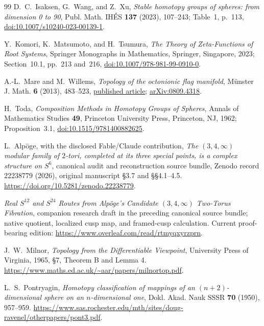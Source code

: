 \begin{thebibliography}{99}
D.~C.~Isaksen, G.~Wang, and Z.~Xu,
\emph{Stable homotopy groups of spheres: from dimension 0 to 90},
Publ. Math. IH\'ES \textbf{137} (2023), 107--243; Table~1, p.~113,
\href{https://doi.org/10.1007/s10240-023-00139-1}
{doi:10.1007/s10240-023-00139-1}.

Y.~Komori, K.~Matsumoto, and H.~Tsumura,
\emph{The Theory of Zeta-Functions of Root Systems},
Springer Monographs in Mathematics, Springer, Singapore, 2023;
Section~10.1, pp.~213 and~216,
\href{https://doi.org/10.1007/978-981-99-0910-0}
{doi:10.1007/978-981-99-0910-0}.

A.-L.~Mare and M.~Willems,
\emph{Topology of the octonionic flag manifold},
M\"unster J. Math. \textbf{6} (2013), 483--523,
\href{https://www.uni-muenster.de/FB10/mjm/vol_6/mjm_vol_6_14.pdf}
{published article};
\href{https://arxiv.org/abs/0809.4318}{arXiv:0809.4318}.

H.~Toda,
\emph{Composition Methods in Homotopy Groups of Spheres},
Annals of Mathematics Studies \textbf{49},
Princeton University Press, Princeton, NJ, 1962;
Proposition~3.1,
\href{https://doi.org/10.1515/9781400882625}
{doi:10.1515/9781400882625}.

L.~Alp\"oge, with the disclosed Fable/Claude contribution,
\emph{The \((3,4,\infty)\) modular family of \(2\)-tori, completed at
its three special points, is a complex structure on \(S^6\)},
canonical audit and reconstruction source bundle, Zenodo record 22238779
(2026), original manuscript \S3.7 and \S\S4.1--4.5.
\url{https://doi.org/10.5281/zenodo.22238779}.

\emph{Real \(S^{12}\) and \(S^{24}\) Routes from Alp\"oge's
Candidate \((3,4,\infty)\) Two-Torus Fibration},
companion research draft in the preceding canonical source bundle;
native quotient, localized cusp map, and framed-cusp calculation.
Current proof-bearing edition:
\url{https://www.overleaf.com/read/rtmyqxyrzprn}.

J.~W.~Milnor, \emph{Topology from the Differentiable Viewpoint},
University Press of Virginia, 1965, \S7, Theorem B and Lemma 4.
\url{https://www.maths.ed.ac.uk/~aar/papers/milnortop.pdf}.

L.~S.~Pontryagin,
\emph{Homotopy classification of mappings of an \((n+2)\)-dimensional
sphere on an \(n\)-dimensional one},
Dokl. Akad. Nauk SSSR \textbf{70} (1950), 957--959.
\url{https://www.sas.rochester.edu/mth/sites/doug-ravenel/otherpapers/pont3.pdf}.


\end{thebibliography}
